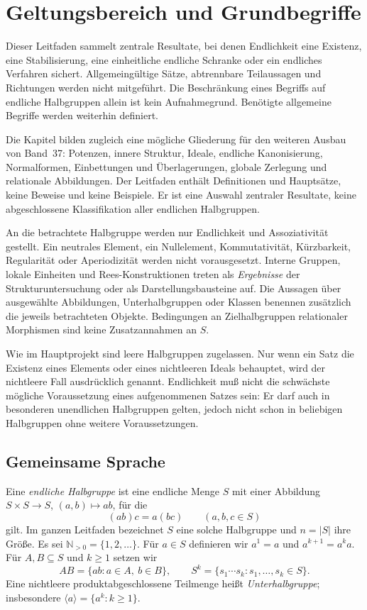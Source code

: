 \chapter{Geltungsbereich und Grundbegriffe}

Dieser Leitfaden sammelt zentrale Resultate, bei denen Endlichkeit
eine Existenz, eine Stabilisierung, eine einheitliche endliche Schranke
oder ein endliches Verfahren sichert. Allgemeingültige Sätze,
abtrennbare Teilaussagen und Richtungen werden nicht mitgeführt.
Die Beschränkung eines Begriffs auf endliche Halbgruppen allein ist
kein Aufnahmegrund.
Benötigte allgemeine Begriffe werden weiterhin definiert.

Die Kapitel bilden zugleich eine mögliche Gliederung für den weiteren
Ausbau von Band~37: Potenzen, innere Struktur, Ideale, endliche
Kanonisierung, Normalformen, Einbettungen und Überlagerungen, globale Zerlegung und
relationale Abbildungen.
Der Leitfaden enthält Definitionen und Hauptsätze, keine Beweise und
keine Beispiele. Er ist eine Auswahl zentraler Resultate, keine
abgeschlossene Klassifikation aller endlichen Halbgruppen.

An die betrachtete Halbgruppe werden nur Endlichkeit und Assoziativität
gestellt. Ein neutrales Element, ein Nullelement, Kommutativität,
Kürzbarkeit, Regularität oder Aperiodizität werden nicht vorausgesetzt.
Interne Gruppen, lokale Einheiten und Rees-Konstruktionen treten als
\emph{Ergebnisse} der Strukturuntersuchung oder als Darstellungsbausteine auf.
Die Aussagen über ausgewählte Abbildungen, Unterhalbgruppen oder Klassen
benennen zusätzlich die jeweils betrachteten Objekte. Bedingungen an
Zielhalbgruppen relationaler Morphismen sind keine Zusatzannahmen an $S$.

Wie im Hauptprojekt sind leere Halbgruppen zugelassen. Nur wenn ein Satz
die Existenz eines Elements oder eines nichtleeren Ideals behauptet,
wird der nichtleere Fall ausdrücklich genannt. Endlichkeit muß nicht
die schwächste mögliche Voraussetzung eines aufgenommenen Satzes sein:
Er darf auch in besonderen unendlichen Halbgruppen gelten, jedoch
nicht schon in beliebigen Halbgruppen ohne weitere Voraussetzungen.

\section{Gemeinsame Sprache}

\begin{definition}
Eine \emph{endliche Halbgruppe} ist eine endliche Menge $S$ mit einer
Abbildung $S\times S\to S$, $(a,b)\mapsto ab$, für die
\[
 (ab)c=a(bc)\qquad(a,b,c\in S)
\]
gilt. Im ganzen Leitfaden bezeichnet $S$ eine solche Halbgruppe und
$n=|S|$ ihre Größe. Es sei $\mathbb N_{>0}=\{1,2,\ldots\}$.
Für $a\in S$ definieren wir $a^1=a$ und $a^{k+1}=a^k a$.
Für $A,B\subseteq S$ und $k\geq1$ setzen wir
\[
 AB=\{ab:a\in A,\ b\in B\},\qquad
 S^k=\{s_1\cdots s_k:s_1,\ldots,s_k\in S\}.
\]
Eine nichtleere produktabgeschlossene Teilmenge heißt
\emph{Unterhalbgruppe}; insbesondere
$\langle a\rangle=\{a^k:k\geq1\}$.
\end{definition}

